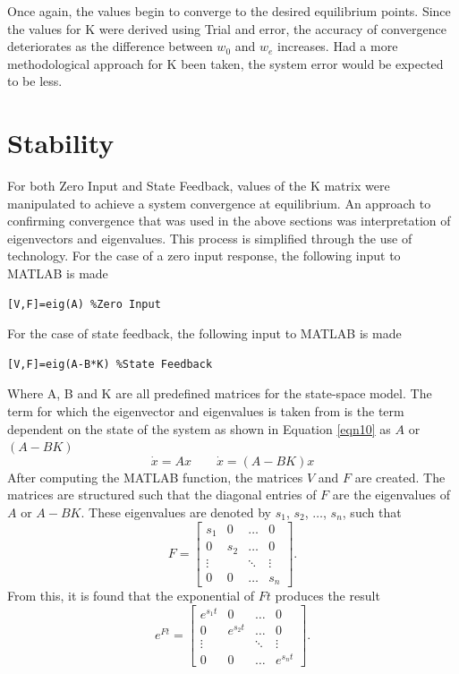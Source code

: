 \documentclass[12pt]{article}
\begin{document}
Once again, the values begin to converge to the desired equilibrium points. Since the values for K were derived using Trial and error, the accuracy of convergence deteriorates as the difference between $w_{0}$ and $w_{e}$ increases. Had a more methodological approach for K been taken, the system error would be expected to be less.
\section{Stability}
For both Zero Input and State Feedback, values of the K matrix were manipulated to achieve a system convergence at equilibrium. An approach to confirming convergence that was used in the above sections was interpretation of eigenvectors and eigenvalues. This process is simplified through the use of technology. For the case of a zero input response, the following input to MATLAB is made
\begin{lstlisting}[frame=single]
[V,F]=eig(A) %Zero Input
\end{lstlisting}
For the case of state feedback, the following input to MATLAB is made
\begin{lstlisting}[frame=single]
[V,F]=eig(A-B*K) %State Feedback
\end{lstlisting}
Where A, B and K are all predefined matrices for the state-space model. The term for which the eigenvector and eigenvalues is taken from is the term dependent on the state of the system as shown in Equation \ref{eqn10} as $A$ or $(A-BK)$
\begin{equation}
\label{eqn10}
\dot{x} = Ax
\qquad
\dot{x} = (A-BK)x
\end{equation}
After computing the MATLAB function, the matrices $V$ and $F$ are created. The matrices are structured such that the diagonal entries of $F$ are the eigenvalues of $A$ or $A-BK$.  These eigenvalues are denoted by $s_1$, $s_2$, $\hdots$, $s_n$, such that
\\
\begin{equation*}
F = 
\begin{bmatrix}
s_1 & 0 & \hdots & 0 \\
0 & s_2 & \hdots & 0 \\
\vdots & & \ddots & \vdots \\
0 & 0 & \hdots & s_n
\end{bmatrix}.
\end{equation*}
From this, it is found that the exponential of $F t$ produces the result
\begin{equation*}
e^{Ft}  =
\begin{bmatrix}
e^{s_1 t} & 0 & \hdots & 0 \\
0 & e^{s_2 t} & \hdots & 0 \\
\vdots & & \ddots & \vdots \\
0 & 0 & \hdots & e^{s_n t}
\end{bmatrix}.
\end{equation*}
\end{document}
